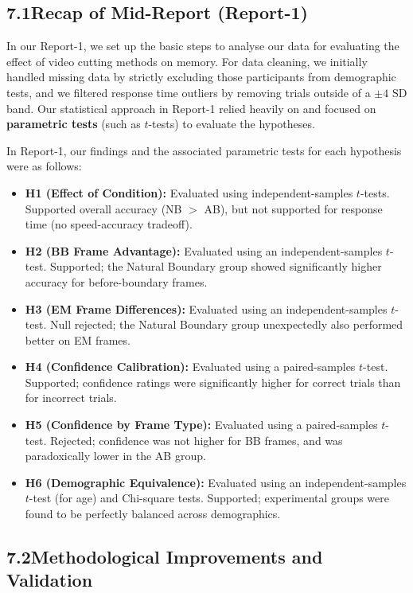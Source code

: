 \documentclass[11pt]{article}
\begin{document}
\subsection*{7.1\quad Recap of Mid-Report (Report-1)}

In our Report-1, we set up the basic steps to analyse our data for evaluating the effect of video cutting methods on memory. For data cleaning, we initially handled missing data by strictly excluding those participants from demographic tests, and we filtered response time outliers by removing trials outside of a $\pm 4 \text{ SD}$ band. Our statistical approach in Report-1 relied heavily on and focused on \textbf{parametric tests} (such as $t$-tests) to evaluate the hypotheses. 

In Report-1, our findings and the associated parametric tests for each hypothesis were as follows:
\begin{itemize}
    \item \textbf{H1 (Effect of Condition):} Evaluated using independent-samples $t$-tests. Supported overall accuracy (NB $>$ AB), but not supported for response time (no speed-accuracy tradeoff).
    \item \textbf{H2 (BB Frame Advantage):} Evaluated using an independent-samples $t$-test. Supported; the Natural Boundary group showed significantly higher accuracy for before-boundary frames.
    \item \textbf{H3 (EM Frame Differences):} Evaluated using an independent-samples $t$-test. Null rejected; the Natural Boundary group unexpectedly also performed better on EM frames.
    \item \textbf{H4 (Confidence Calibration):} Evaluated using a paired-samples $t$-test. Supported; confidence ratings were significantly higher for correct trials than for incorrect trials.
    \item \textbf{H5 (Confidence by Frame Type):} Evaluated using a paired-samples $t$-test. Rejected; confidence was not higher for BB frames, and was paradoxically lower in the AB group.
    \item \textbf{H6 (Demographic Equivalence):} Evaluated using an independent-samples $t$-test (for age) and Chi-square tests. Supported; experimental groups were found to be perfectly balanced across demographics.
\end{itemize}

\subsection*{7.2\quad Methodological Improvements and Validation}
\end{document}
